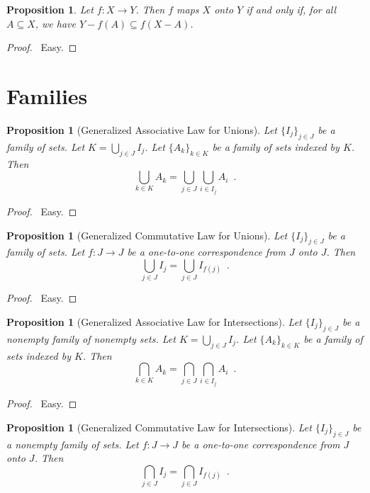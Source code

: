 \documentclass{report}
\let\qed\relax
\newtheorem{prop}[ax]{Proposition}
\theoremstyle{definition}
\begin{document}
\begin{prop}
Let $f : X \rightarrow Y$. Then $f$ maps $X$ onto $Y$ if and only if, for all $A \subseteq X$, we have $Y - f(A) \subseteq f(X-A)$.
\end{prop}

\begin{proof}
\pf\ Easy. \qed
\end{proof}

\section{Families}

\begin{prop}[Generalized Associative Law for Unions]
Let $\{I_j\}_{j \in J}$ be a family of sets. Let $K = \bigcup_{j \in J} I_j$. Let $\{A_k\}_{k \in K}$ be a family of sets indexed by $K$. Then
\[ \bigcup_{k \in K} A_k = \bigcup_{j \in J} \bigcup_{i \in I_j} A_i \enspace . \]
\end{prop}

\begin{proof}
\pf\ Easy. \qed
\end{proof}

\begin{prop}[Generalized Commutative Law for Unions]
Let $\{I_j\}_{j \in J}$ be a family of sets. Let $f : J \rightarrow J$ be a one-to-one correspondence from $J$ onto $J$. Then
\[ \bigcup_{j \in J} I_j = \bigcup_{j \in J} I_{f(j)} \enspace . \]
\end{prop}

\begin{proof}
\pf\ Easy. \qed
\end{proof}

\begin{prop}[Generalized Associative Law for Intersections]
Let $\{I_j\}_{j \in J}$ be a nonempty family of nonempty sets. Let $K = \bigcup_{j \in J} I_j$. Let $\{A_k\}_{k \in K}$ be a family of sets indexed by $K$. Then
\[ \bigcap_{k \in K} A_k = \bigcap_{j \in J} \bigcap_{i \in I_j} A_i \enspace . \]
\end{prop}

\begin{proof}
\pf\ Easy. \qed
\end{proof}

\begin{prop}[Generalized Commutative Law for Intersections]
Let $\{I_j\}_{j \in J}$ be a nonempty family of sets. Let $f : J \rightarrow J$ be a one-to-one correspondence from $J$ onto $J$. Then
\[ \bigcap_{j \in J} I_j = \bigcap_{j \in J} I_{f(j)} \enspace . \]
\end{prop}
\end{document}
